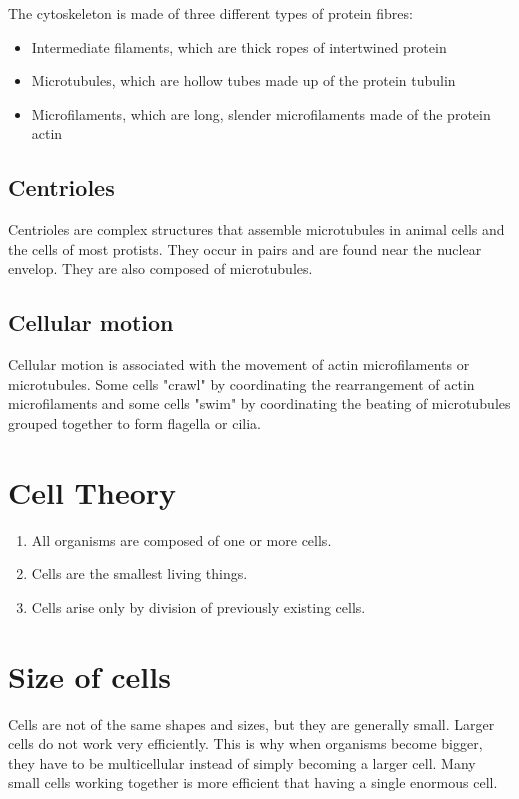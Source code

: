 \documentclass[11pt]{article}
\begin{document}
The cytoskeleton is made of three different types of protein fibres:
\begin{itemize}
\item Intermediate filaments, which are thick ropes of intertwined protein
\item Microtubules, which are hollow tubes made up of the protein tubulin
\item Microfilaments, which are long, slender microfilaments made of the protein actin
\end{itemize}
\subsection{Centrioles}
\label{sec:orgdc3affb}
Centrioles are complex structures that assemble microtubules in animal cells and the cells of most protists. They occur in pairs and are found near the nuclear envelop. They are also composed of microtubules.
\subsection{Cellular motion}
\label{sec:org013f6a5}
Cellular motion is associated with the movement of actin microfilaments or microtubules. Some cells "crawl" by coordinating the rearrangement of actin microfilaments and some cells "swim" by coordinating the beating of microtubules grouped together to form flagella or cilia.
\section{Cell Theory}
\label{sec:org2cef26d}
\begin{enumerate}
\item All organisms are composed of one or more cells.
\item Cells are the smallest living things.
\item Cells arise only by division of previously existing cells.
\end{enumerate}
\section{Size of cells}
\label{sec:orge10143b}
Cells are not of the same shapes and sizes, but they are generally small. Larger cells do not work very efficiently. This is why when organisms become bigger, they have to be multicellular instead of simply becoming a larger cell. Many small cells working together is more efficient that having a single enormous cell.
\end{document}
